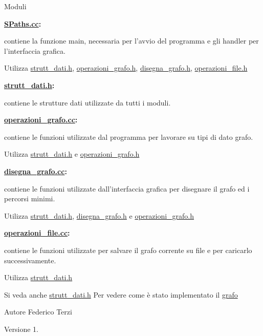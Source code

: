 \begin{DoxyItemize}
\begin{DoxyParagraph}{Moduli}
\begin{DoxyItemize}
\item {\bfseries \hyperlink{SPaths_8cc}{S\-Paths.\-cc}\-:} \par
 contiene la funzione main, necessaria per l'avvio del programma e gli handler per l'interfaccia grafica. \par
 Utilizza {\ttfamily \hyperlink{strutt__dati_8h}{strutt\-\_\-dati.\-h}}, {\ttfamily \hyperlink{operazioni__grafo_8h}{operazioni\-\_\-grafo.\-h}}, {\ttfamily \hyperlink{disegna__grafo_8h}{disegna\-\_\-grafo.\-h}}, {\ttfamily \hyperlink{operazioni__file_8h}{operazioni\-\_\-file.\-h}} 
\item {\bfseries \hyperlink{strutt__dati_8h}{strutt\-\_\-dati.\-h}\-:} \par
 contiene le strutture dati utilizzate da tutti i moduli.
\item {\bfseries \hyperlink{operazioni__grafo_8cc}{operazioni\-\_\-grafo.\-cc}\-:} \par
 contiene le funzioni utilizzate dal programma per lavorare su tipi di dato grafo. \par
 Utilizza {\ttfamily \hyperlink{strutt__dati_8h}{strutt\-\_\-dati.\-h}} e {\ttfamily \hyperlink{operazioni__grafo_8h}{operazioni\-\_\-grafo.\-h}} 
\item {\bfseries \hyperlink{disegna__grafo_8cc}{disegna\-\_\-grafo.\-cc}\-:} \par
 contiene le funzioni utilizzate dall'interfaccia grafica per disegnare il grafo ed i percorsi minimi. \par
 Utilizza {\ttfamily \hyperlink{strutt__dati_8h}{strutt\-\_\-dati.\-h}}, {\ttfamily \hyperlink{disegna__grafo_8h}{disegna\-\_\-grafo.\-h}} e {\ttfamily \hyperlink{operazioni__grafo_8h}{operazioni\-\_\-grafo.\-h}} 
\item {\bfseries \hyperlink{operazioni__file_8cc}{operazioni\-\_\-file.\-cc}\-:} \par
 contiene le funzioni utilizzate per salvare il grafo corrente su file e per caricarlo successivamente. \par
 Utilizza {\ttfamily \hyperlink{strutt__dati_8h}{strutt\-\_\-dati.\-h}} 
\end{DoxyItemize}
\end{DoxyParagraph}
\begin{DoxySeeAlso}{Si veda anche}
\hyperlink{strutt__dati_8h}{strutt\-\_\-dati.\-h} Per vedere come è stato implementato il \hyperlink{structgrafo}{grafo} 
\end{DoxySeeAlso}
\begin{DoxyAuthor}{Autore}
Federico Terzi 
\end{DoxyAuthor}
\begin{DoxyVersion}{Versione}
1. 
\end{DoxyVersion}

\end{DoxyItemize}